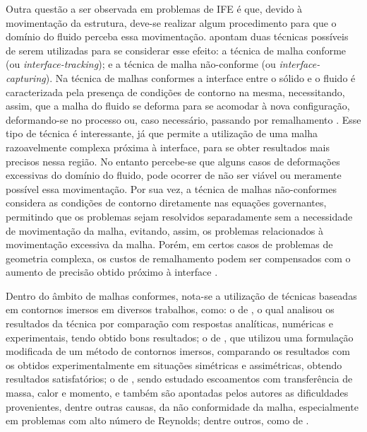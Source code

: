 \documentclass[_ArquivoPrincipal.tex]{subfiles}
\begin{document}
Outra questão a ser observada em problemas de IFE é que, devido à movimentação da estrutura, deve-se realizar algum procedimento para que o domínio do fluido perceba essa movimentação.  apontam duas técnicas possíveis de serem utilizadas para se considerar esse efeito: a técnica de malha conforme (ou \textit{interface-tracking}); e a técnica de malha não-conforme (ou \textit{interface-capturing}). Na técnica de malhas conformes a interface entre o sólido e o fluido é caracterizada pela presença de condições de contorno na mesma, necessitando, assim, que a malha do fluido se deforma para se acomodar à nova configuração, deformando-se no processo ou, caso necessário, passando por remalhamento \cite{terahara2020heart}. Esse tipo de técnica é interessante, já que permite a utilização de uma malha razoavelmente complexa próxima à interface, para se obter resultados mais precisos nessa região. No entanto percebe-se que alguns casos de deformações excessivas do domínio do fluido, pode ocorrer de não ser viável ou meramente possível essa movimentação. Por sua vez, a técnica de malhas não-conformes considera as condições de contorno diretamente nas equações governantes, permitindo que os problemas sejam resolvidos separadamente sem a necessidade de movimentação da malha, evitando, assim, os problemas relacionados à movimentação excessiva da malha. Porém, em certos casos de problemas de geometria complexa, os custos de remalhamento podem ser compensados com o aumento de precisão obtido próximo à interface \cite{bazilevs2013computational,hou2012numerical,bazilevs2015ale}.

Dentro do âmbito de malhas conformes, nota-se a utilização de técnicas baseadas em contornos imersos em diversos trabalhos, como: o de , o qual analisou os resultados da técnica por comparação com respostas analíticas, numéricas e experimentais, tendo obtido bons resultados; o de , que utilizou uma formulação modificada de um método de contornos imersos, comparando os resultados com os obtidos experimentalmente em situações simétricas e assimétricas, obtendo resultados satisfatórios; o de , sendo estudado escoamentos com transferência de massa, calor e momento, e também são apontadas pelos autores as dificuldades provenientes, dentre outras causas, da não conformidade da malha, especialmente em problemas com alto número de Reynolds; dentre outros, como de .
\end{document}

